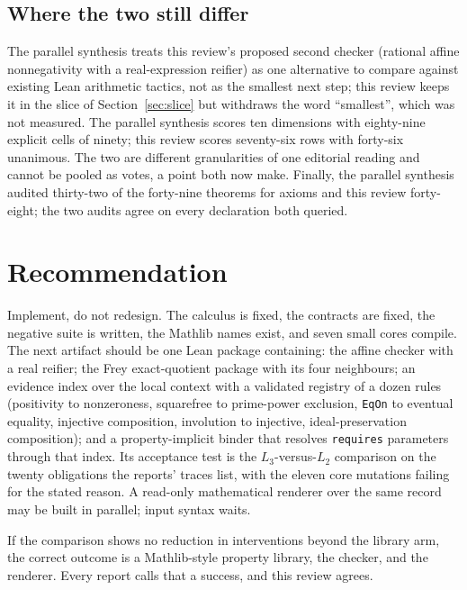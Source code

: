\documentclass[11pt,a4paper]{article}
\newcommand{\code}[1]{\nolinkurl{#1}}
\theoremstyle{definition}
\begin{document}
\subsection{Where the two still differ}
The parallel synthesis treats this review's proposed second checker (rational affine nonnegativity with a real-expression reifier) as one alternative to compare against existing Lean arithmetic tactics, not as the smallest next step; this review keeps it in the slice of Section~\ref{sec:slice} but withdraws the word ``smallest'', which was not measured. The parallel synthesis scores ten dimensions with eighty-nine explicit cells of ninety; this review scores seventy-six rows with forty-six unanimous. The two are different granularities of one editorial reading and cannot be pooled as votes, a point both now make. Finally, the parallel synthesis audited thirty-two of the forty-nine theorems for axioms and this review forty-eight; the two audits agree on every declaration both queried.

\section{Recommendation}\label{sec:recommendation}
Implement, do not redesign. The calculus is fixed, the contracts are fixed, the negative suite is written, the Mathlib names exist, and seven small cores compile. The next artifact should be one Lean package containing: the affine checker with a real reifier; the Frey exact-quotient package with its four neighbours; an evidence index over the local context with a validated registry of a dozen rules (positivity to nonzeroness, squarefree to prime-power exclusion, \code{EqOn} to eventual equality, injective composition, involution to injective, ideal-preservation composition); and a property-implicit binder that resolves \code{requires} parameters through that index. Its acceptance test is the $L_3$-versus-$L_2$ comparison on the twenty obligations the reports' traces list, with the eleven core mutations failing for the stated reason. A read-only mathematical renderer over the same record may be built in parallel; input syntax waits.

If the comparison shows no reduction in interventions beyond the library arm, the correct outcome is a Mathlib-style property library, the checker, and the renderer. Every report calls that a success, and this review agrees.
\end{document}
